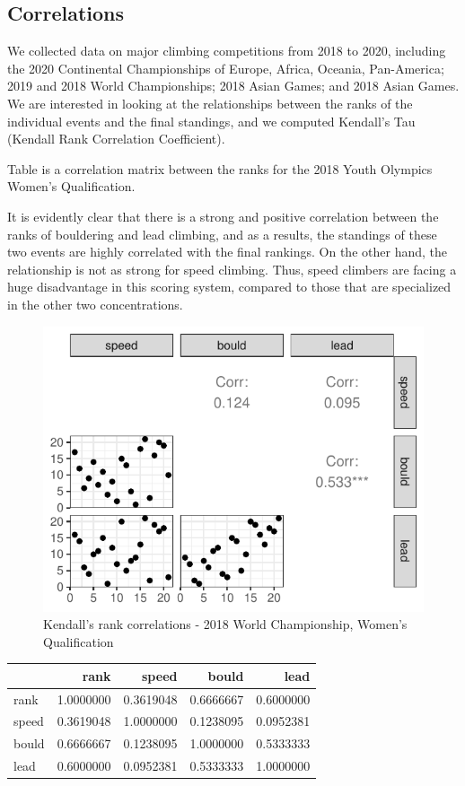 \documentclass[
  12pt,
]{article}
\begin{document}
\hypertarget{correlations}{%
\subsection{Correlations}\label{correlations}}

We collected data on major climbing competitions from 2018 to 2020,
including the 2020 Continental Championships of Europe, Africa, Oceania,
Pan-America; 2019 and 2018 World Championships; 2018 Asian Games; and
2018 Asian Games. We are interested in looking at the relationships
between the ranks of the individual events and the final standings, and
we computed Kendall's Tau (Kendall Rank Correlation Coefficient).

Table is a correlation matrix between the ranks for the 2018 Youth
Olympics Women's Qualification.

It is evidently clear that there is a strong and positive correlation
between the ranks of bouldering and lead climbing, and as a results, the
standings of these two events are highly correlated with the final
rankings. On the other hand, the relationship is not as strong for speed
climbing. Thus, speed climbers are facing a huge disadvantage in this
scoring system, compared to those that are specialized in the other two
concentrations.

\begin{figure}
\centering
\includegraphics{draft_files/figure-latex/unnamed-chunk-7-1.pdf}
\caption{Kendall's rank correlations - 2018 World Championship, Women's
Qualification}
\end{figure}

\begin{longtable}[]{@{}lrrrr@{}}
\toprule
& rank & speed & bould & lead \\
\midrule
\endhead
rank & 1.0000000 & 0.3619048 & 0.6666667 & 0.6000000 \\
speed & 0.3619048 & 1.0000000 & 0.1238095 & 0.0952381 \\
bould & 0.6666667 & 0.1238095 & 1.0000000 & 0.5333333 \\
lead & 0.6000000 & 0.0952381 & 0.5333333 & 1.0000000 \\
\bottomrule
\end{longtable}
\end{document}

